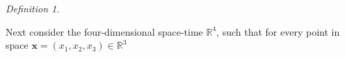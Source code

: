 \documentclass{article}
\theoremstyle{definition}
\newtheorem{definition}{Definition}[section]
\theoremstyle{remark}
\renewcommand{\vec}[1]{\mathbf{#1}}
\newtheorem{definition}{Definition}
\begin{document}
\begin{definition}
\begin{comment}
then $\{b_{mn}\}_{m,n=0,1,2,3}$ is a two times covariant tensor on
$\mathcal{S}$. Next it is well known that, given a four-covector
$(a_0,a_1,a_2,a_3)$ a four-vector $(b^0,b^1,b^2,b^3)$, a two times
covariant tensor $\{c_{mn}\}_{m,n=0,1,2,3}$ and a two times
contravariant tensor $\{d^{mn}\}_{m,n=0,1,2,3}$ on the group
$\mathcal{S}$, the quantities
\begin{equation}\label{fgjfjhgghhgjghjhjkkkkgjghghuiiiukljkint}
\sum_{k=0}^{3}a_kb^k\quad\text{and}\quad
\sum_{m=0}^{3}\sum_{n=0}^{3}c_{mn}d^{mn}
\end{equation}
are scalars on $\mathcal{S}$, the four-component fields defined by
\begin{equation}\label{fgjfjhgghhgjghjhjkkkkgjghghuiiiulkkjint}
\Big\{\sum_{k=0}^{3}d^{mk}a_{k}\Big\}_{m=0,1,2,3}\quad\text{and}\quad
\Big\{\sum_{k=0}^{3}c_{mk}b^{k}\Big\}_{m=0,1,2,3}
\end{equation}
are four-vector and four-covector on $\mathcal{S}$ and moreover,
$16$-component fields $\{\hat c^{mn}\}_{m,n=0,1,2,3}$ and $\{\hat
d_{mn}\}_{m,n=0,1,2,3}$ defined by
\begin{equation}\label{fgjfjhgghhgjghjhjkkkkgjghghuiiiulkkjlkklint}
\hat
c^{mn}:=\sum_{k=0}^{3}\sum_{j=0}^{3}d^{mj}d^{nk}c_{jk}\quad\text{and}\quad
\hat
d_{mn}:=\sum_{j=0}^{3}\sum_{k=0}^{3}c_{mj}c_{nk}d^{jk}\quad\quad\forall\,
m,n=0,1,2,3,
\end{equation}
are two times contravariant and two times covariant tensors on
$\mathcal{S}$. Next, it is also well known that given a two times
covariant tensor $\{c_{mn}\}_{m,n=0,1,2,3}$ and a two times
contravariant tensor $\{d^{mn}\}_{m,n=0,1,2,3}$ on the group
$\mathcal{S}$ the $16$-component fields $\{c_{nm}\}_{m,n=0,1,2,3}$
and $\{d^{nm}\}_{m,n=0,1,2,3}$ are also two times covariant and two
times contravariant tensors on $\mathcal{S}$. Finally, it is well
known that, if $a:=a(x^0,x^1,x^2,x^3)$ is a scalar field on the
group $\mathcal{S}$, then the four-component field
$(w_0,w_1,w_2,w_3)$ defined by:
\begin{equation}\label{fgjfjhgghhgjghjhjkkkkgjghghuiiiulkkjlkklplikklint}
w_j:=\frac{\partial a}{\partial x^j}\quad\quad\forall\,j=0,1,2,3,
\end{equation}
is a \underline{four-covector} field on the group $\mathcal{S}$.
\end{comment}
%
%
%
\end{definition}
Next consider the four-dimensional space-time $\mathbb{R}^4$, such
that for every point in space $\vec x=(x_1,x_2,x_3)\in\mathbb{R}^3$
\end{document}
